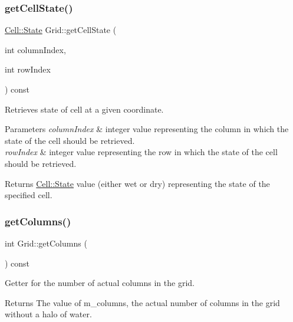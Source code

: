 \subsubsection{\texorpdfstring{get\+Cell\+State()}{getCellState()}}
{\footnotesize\ttfamily \hyperlink{class_cell_a21d74a2efcb79c93e5649b06a50b7cf5}{Cell\+::\+State} Grid\+::get\+Cell\+State (\begin{DoxyParamCaption}\item[{int}]{column\+Index,  }\item[{int}]{row\+Index }\end{DoxyParamCaption}) const}



Retrieves state of cell at a given coordinate. 


\begin{DoxyParams}{Parameters}
{\em column\+Index} & integer value representing the column in which the state of the cell should be retrieved.\\
\hline
{\em row\+Index} & integer value representing the row in which the state of the cell should be retrieved.\\
\hline
\end{DoxyParams}
\begin{DoxyReturn}{Returns}
\hyperlink{class_cell_a21d74a2efcb79c93e5649b06a50b7cf5}{Cell\+::\+State} value (either wet or dry) representing the state of the specified cell. 
\end{DoxyReturn}
\mbox{\label{class_grid_aee0114021b6858483965cc1bffd7b88b}} 
\subsubsection{\texorpdfstring{get\+Columns()}{getColumns()}}
{\footnotesize\ttfamily int Grid\+::get\+Columns (\begin{DoxyParamCaption}{ }\end{DoxyParamCaption}) const}



Getter for the number of actual columns in the grid. 

\begin{DoxyReturn}{Returns}
The value of m\+\_\+columns, the actual number of columns in the grid without a halo of water. 
\end{DoxyReturn}
\mbox{\label{class_grid_aa9397afb775457f87b9096acf6082383}} 
